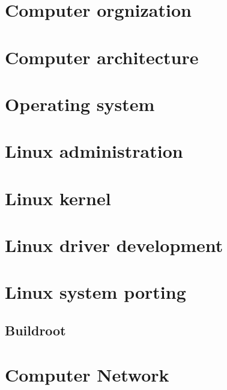 \documentclass[12pt,a4paper,UTF8]{ctexbook}
\begin{document}
	\part{Computer orgnization}
	
	\part{Computer architecture}
	
	\begin{comment} 
	rather stupid, but helpful 
	\chapter{Microcontroller}
	\chapter{Digital signal processor}
	\chapter{ARM processor}
	\end{comment}

	\part{Operating system}
	
	\part{Linux administration}
	
	\part{Linux kernel}
	
	\part{Linux driver development}
	
	\part{Linux system porting}
	\chapter{Buildroot}
	
	\part{Computer Network}
\end{document}

